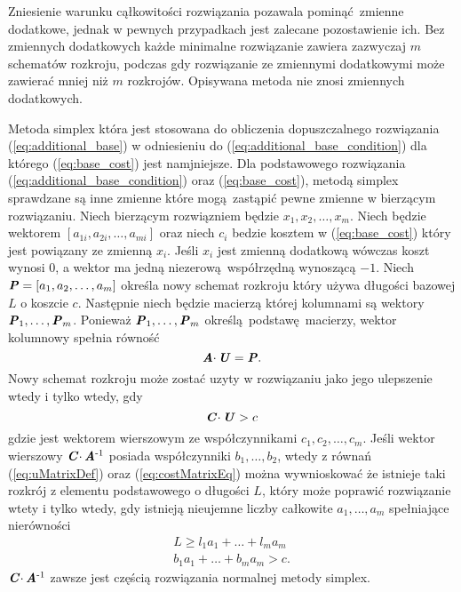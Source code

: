 Zniesienie warunku cąłkowitości rozwiązania pozawala pominąć zmienne dodatkowe, jednak w pewnych przypadkach jest zalecane pozostawienie ich. Bez zmiennych dodatkowych każde minimalne rozwiązanie zawiera zazwyczaj $m$ schematów rozkroju, podczas gdy rozwiązanie ze zmiennymi dodatkowymi może zawierać mniej niż $m$ rozkrojów. Opisywana metoda nie znosi zmiennych dodatkowych.

Metoda simplex która jest stosowana do obliczenia dopuszczalnego rozwiązania (\ref{eq:additional_base}) w odniesieniu do (\ref{eq:additional_base_condition}) dla którego (\ref{eq:base_cost}) jest namjniejsze. Dla podstawowego rozwiązania (\ref{eq:additional_base_condition}) oraz (\ref{eq:base_cost}), metodą simplex sprawdzane są inne zmienne które mogą zastąpić pewne zmienne w bierzącym rozwiązaniu. Niech bierzącym rozwiązniem będzie $x_1,x_2,\dots,x_m$. Niech  będzie wektorem $[a_{1i}, a_{2i}, \dots, a_{mi}]$ oraz niech $c_i$ bedzie kosztem w (\ref{eq:base_cost}) który jest powiązany ze zmienną $x_i$. Jeśli $x_i$ jest zmienną dodatkową wówczas koszt wynosi $0$, a wektor ma jedną niezerową współrzędną wynoszącą $-1$. Niech $\textbf{\textit{P}} = [a_1,a_2,\dots,a_m]$ określa nowy schemat rozkroju który używa długości bazowej $L$ o koszcie $c$. Następnie niech  będzie macierzą której kolumnami są wektory $\textbf{\textit{P}}_1,\dots,\textbf{\textit{P}}_m$. Ponieważ $\textbf{\textit{P}}_1, \dots, \textbf{\textit{P}}_m$ określą podstawę macierzy, wektor kolumnowy  spełnia równość
\begin{equation}\label{eq:uMatrixDef}
  \textbf{\textit{A}} \cdotp \textbf{\textit{U}} = \textbf{\textit{P}}.
\end{equation}
Nowy schemat rozkroju może zostać uzyty w rozwiązaniu jako jego ulepszenie wtedy i tylko wtedy, gdy
\begin{equation}\label{eq:costMatrixEq}
  \textbf{\textit{C}} \cdotp \textbf{\textit{U}} > c
\end{equation}
gdzie  jest wektorem wierszowym ze współczynnikami $c_1,c_2,\dots,c_m$. Jeśli wektor wierszowy $\textbf{\textit{C}} \cdotp \textbf{\textit{A}}\textsuperscript{-1}$ posiada współczynniki $b_1,\dots,b_2$, wtedy z równań (\ref{eq:uMatrixDef}) oraz (\ref{eq:costMatrixEq}) można wywnioskować że istnieje taki rozkrój z elementu podstawowego o długości $L$, który może poprawić rozwiązanie wtety i tylko wtedy, gdy istnieją nieujemne liczby całkowite $a_1,\dots,a_m$ spełniające nierówności
\begin{align}
L \ge l_1a_1+\dots+l_ma_m \label{length_eq} \\
b_1a_1+\dots+b_ma_m > c. \label{cost_eq}
\end{align}
$\textbf{\textit{C}} \cdotp \textbf{\textit{A}}\textsuperscript{-1}$ zawsze jest częścią rozwiązania normalnej metody simplex.

